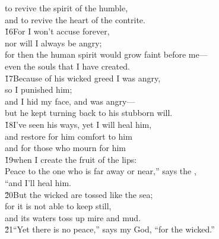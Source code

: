\begin{poetry}
\poeml to revive the spirit of the humble, \\
\poemll    and to revive the heart of the contrite. \\
\poeml \v{16}For I won't accuse forever, \\
\poemll    nor will I always be angry; \\
\poeml for then the human spirit would grow faint before me--- \\
\poemll    even the souls that I have created. \\
\poeml \v{17}Because of his wicked greed I was angry, \\
\poemll    so I punished him; \\
\poeml and I hid my face, and was angry--- \\
\poemll    but he kept turning back to his stubborn will. \\
\poeml \v{18}I've seen his ways, yet I will heal him, \\
\poemll    and restore for him comfort to him \\
\poemlll       and for those who mourn for him \\
\poeml \v{19}when I create the fruit of the lips: \\
\poemll    Peace to the one who is far away or near,'' says the , \\
\poemlll       ``and I'll heal him. \\
\poeml \v{20}But the wicked are tossed like the sea; \\
\poemll    for it is not able to keep still, \\
\poemlll       and its waters toss up mire and mud. \\
\poeml \v{21}``Yet there is no peace,'' says my God, ``for the wicked.''
\end{poetry}

